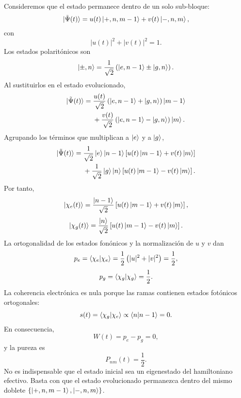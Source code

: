 \documentclass[11pt]{article}
\begin{document}
Consideremos que el estado permanece dentro de un solo sub-bloque:
\begin{equation}
  \ket{\tilde\Psi(t)}
  =
  u(t)\ket{+,n,m-1}
  +
  v(t)\ket{-,n,m},
\end{equation}
con
\begin{equation}
  |u(t)|^2+|v(t)|^2=1.
\end{equation}
Los estados polarit\'onicos son
\begin{equation}
  \ket{\pm,n}
  =
  \frac{1}{\sqrt2}
  \left(
  \ket{e,n-1}
  \pm
  \ket{g,n}
  \right).
\end{equation}
Al sustituirlos en el estado evolucionado,
\begin{equation}
\begin{aligned}
  \ket{\tilde\Psi(t)}
  ={}&
  \frac{u(t)}{\sqrt2}
  \left(
  \ket{e,n-1}+\ket{g,n}
  \right)
  \ket{m-1}
  \\
  &+
  \frac{v(t)}{\sqrt2}
  \left(
  \ket{e,n-1}-\ket{g,n}
  \right)
  \ket m.
\end{aligned}
\end{equation}
Agrupando los t\'erminos que multiplican a $\ket e$ y a $\ket g$,
\begin{equation}
\begin{aligned}
  \ket{\tilde\Psi(t)}
  ={}&
  \frac{1}{\sqrt2}
  \ket e\ket{n-1}
  \left[
  u(t)\ket{m-1}+v(t)\ket m
  \right]
  \\
  &+
  \frac{1}{\sqrt2}
  \ket g\ket n
  \left[
  u(t)\ket{m-1}-v(t)\ket m
  \right].
\end{aligned}
\end{equation}
Por tanto,
\begin{equation}
  \ket{\chi_e(t)}
  =
  \frac{\ket{n-1}}{\sqrt2}
  \left[
  u(t)\ket{m-1}+v(t)\ket m
  \right],
\end{equation}
\begin{equation}
  \ket{\chi_g(t)}
  =
  \frac{\ket n}{\sqrt2}
  \left[
  u(t)\ket{m-1}-v(t)\ket m
  \right].
\end{equation}
La ortogonalidad de los estados fon\'onicos y la normalizaci\'on de $u$ y $v$
dan
\begin{equation}
  p_e
  =
  \braket{\chi_e|\chi_e}
  =
  \frac12\left(|u|^2+|v|^2\right)
  =
  \frac12,
\end{equation}
\begin{equation}
  p_g
  =
  \braket{\chi_g|\chi_g}
  =
  \frac12.
\end{equation}
La coherencia electr\'onica es nula porque las ramas contienen estados
fot\'onicos ortogonales:
\begin{equation}
  s(t)
  =
  \braket{\chi_g|\chi_e}
  \propto
  \braket{n|n-1}
  =0.
\end{equation}
En consecuencia,
\begin{equation}
  W(t)=p_e-p_g=0,
\end{equation}
y la pureza es
\begin{equation}
  \boxed{
  P_{nm}(t)=\frac12.
  }
\end{equation}
No es indispensable que el estado inicial sea un eigenestado del hamiltoniano
efectivo. Basta con que el estado evolucionado permanezca dentro del mismo
doblete $\{\ket{+,n,m-1},\ket{-,n,m}\}$.
\end{document}
